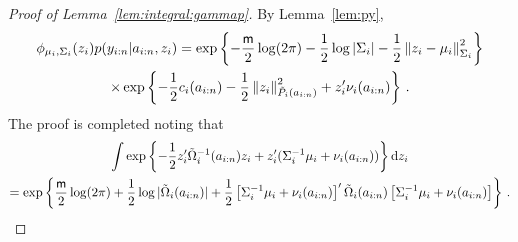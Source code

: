 \begin{proof}[Proof of Lemma~\ref{lem:integral:gammap}]
By Lemma~\ref{lem:py},
\begin{multline*}
\phi_{\mu_i,\Sigma_i}(z_i)p(y_{i:n}|a_{i:n},z_i) = \exp\left\{-\frac{\dimz}{2}\log(2\pi) -\frac{1}{2}\log|\Sigma_i|-\frac{1}{2}\normMat{\Sigma_i}{z_i-\mu_i}^2\right\}\\
\times\exp\left\{-\frac{1}{2}c_{i}(a_{i:n})-\frac{1}{2}\normMat{\tilde{P}_{i}(a_{i:n})}{z_i}^2+z'_i\nu_{i}(a_{i:n})\right\}\eqsp.
\end{multline*}
The proof is completed noting that
\begin{multline*}
\int \exp\left\{-\frac{1}{2}z'_i\tilde{\Omega}_{i}^{-1}(a_{i:n})z_i + z'_i(\Sigma_i^{-1}\mu_i+\nu_{i}(a_{i:n}))\right\}\rmd z_{i}\\
= \exp\left\{\frac{\dimz}{2}\log(2\pi) + \frac{1}{2}\log|\tilde{\Omega}_{i}(a_{i:n})| +\frac{1}{2}\left[\Sigma_i^{-1}\mu_i+\nu_{i}(a_{i:n})\right]'\tilde{\Omega}_{i}(a_{i:n})\left[\Sigma_i^{-1}\mu_i+\nu_{i}(a_{i:n})\right]\right\}\eqsp.
\end{multline*}
\end{proof}

